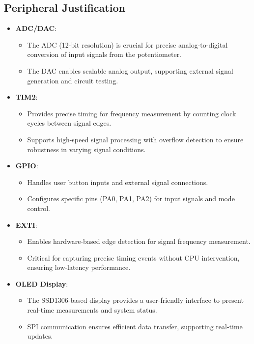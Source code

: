 \subsection{Peripheral Justification}
\begin{itemize}
    \item \textbf{ADC/DAC}: 
        \begin{itemize}
            \item The ADC (12-bit resolution) is crucial for precise analog-to-digital conversion of input signals from the potentiometer.
            \item The DAC enables scalable analog output, supporting external signal generation and circuit testing.
        \end{itemize}
    \item \textbf{TIM2}:
        \begin{itemize}
            \item Provides precise timing for frequency measurement by counting clock cycles between signal edges.
            \item Supports high-speed signal processing with overflow detection to ensure robustness in varying signal conditions.
        \end{itemize}
    \item \textbf{GPIO}:
        \begin{itemize}
            \item Handles user button inputs and external signal connections.
            \item Configures specific pins (PA0, PA1, PA2) for input signals and mode control.
        \end{itemize}
    \item \textbf{EXTI}: 
        \begin{itemize}
            \item Enables hardware-based edge detection for signal frequency measurement.
            \item Critical for capturing precise timing events without CPU intervention, ensuring low-latency performance.
        \end{itemize}
    \item \textbf{OLED Display}: 
        \begin{itemize}
            \item The SSD1306-based display provides a user-friendly interface to present real-time measurements and system status.
            \item SPI communication ensures efficient data transfer, supporting real-time updates.
        \end{itemize}
\end{itemize}
